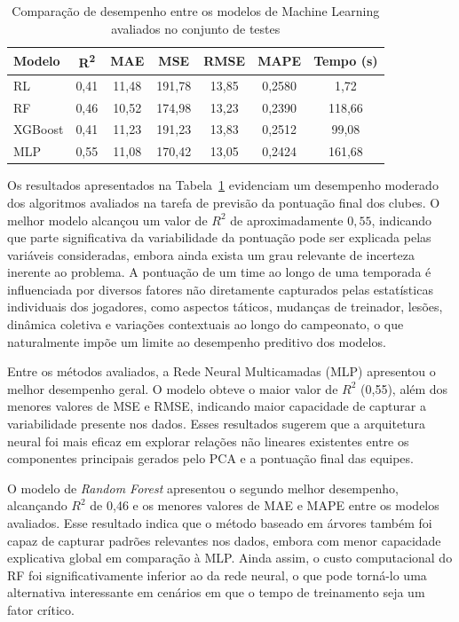 \begin{table}[H]
\centering
\caption{Comparação de desempenho entre os modelos de Machine Learning avaliados no conjunto de testes}
\label{tab:comparacao_modelos}

\begin{tabular}{lcccccc}
\hline
\textbf{Modelo} & \textbf{R\textsuperscript{2}} & \textbf{MAE} & \textbf{MSE} & \textbf{RMSE} & \textbf{MAPE} & \textbf{Tempo (s)} \\
\hline
RL      & 0,41 & 11,48 & 191,78 & 13,85 & 0,2580 & 1,72 \\
RF      & 0,46 & 10,52 & 174,98 & 13,23 & 0,2390 & 118,66 \\
XGBoost & 0,41 & 11,23 & 191,23 & 13,83 & 0,2512 & 99,08 \\
MLP     & 0,55 & 11,08 & 170,42 & 13,05 & 0,2424 & 161,68 \\
\hline
\end{tabular}

\vspace{.3cm}
\end{table}

Os resultados apresentados na Tabela~\ref{tab:comparacao_modelos} evidenciam um desempenho moderado dos algoritmos avaliados na tarefa de previsão da 
pontuação final dos clubes. O melhor modelo alcançou um valor de $R^2$ de aproximadamente $0{,}55$, indicando que parte significativa da variabilidade 
da pontuação pode ser explicada pelas variáveis consideradas, embora ainda exista um grau relevante de incerteza inerente ao problema. A pontuação de um time 
ao longo de uma temporada é influenciada por diversos fatores não diretamente capturados pelas estatísticas individuais dos jogadores, como aspectos táticos, 
mudanças de treinador, lesões, dinâmica coletiva e variações contextuais ao longo do campeonato, o que naturalmente impõe um limite ao desempenho preditivo dos modelos.

Entre os métodos avaliados, a Rede Neural Multicamadas (MLP) apresentou o melhor desempenho geral. O modelo obteve o maior valor de $R^2$ (0{,}55), além dos 
menores valores de MSE e RMSE, indicando maior capacidade de capturar a variabilidade presente nos dados. Esses resultados sugerem que a arquitetura neural foi 
mais eficaz em explorar relações não lineares existentes entre os componentes principais gerados pelo PCA e a pontuação final das equipes.

O modelo de \textit{Random Forest} apresentou o segundo melhor desempenho, alcançando $R^2$ de 0{,}46 e os menores valores de MAE e MAPE entre os 
modelos avaliados. Esse resultado indica que o método baseado em árvores também foi capaz de capturar padrões relevantes nos dados, embora com menor 
capacidade explicativa global em comparação à MLP. Ainda assim, o custo computacional do RF foi significativamente inferior ao da rede neural, o que pode 
torná-lo uma alternativa interessante em cenários em que o tempo de treinamento seja um fator crítico.

